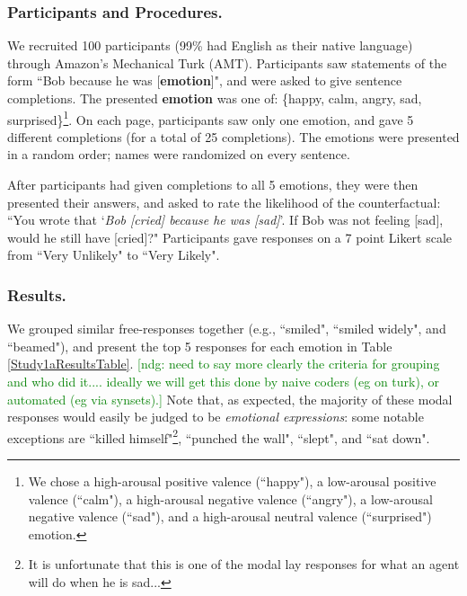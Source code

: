 \documentclass[10pt,letterpaper]{article}
\newcommand{\ndg}[1]{\textcolor{Green}{[ndg: #1]}}
\begin{document}

\subsubsection{Participants and Procedures.} 
We recruited 100 participants (99\% had English as their native language) through Amazon's Mechanical Turk (AMT). Participants saw statements of the form ``Bob \underline{\hspace{3em}} because he was [\textbf{emotion}]", and were asked to give sentence completions. The presented \textbf{emotion} was one of: \{happy, calm, angry, sad, surprised\}\footnote{We chose a high-arousal positive valence (``happy"), a low-arousal positive valence (``calm"), a high-arousal negative valence (``angry"), a low-arousal negative valence (``sad"), and a high-arousal neutral valence (``surprised") emotion.}. On each page, participants saw only one emotion, and gave 5 different completions (for a total of 25 completions). The emotions were presented in a random order; names were randomized on every sentence.

After participants had given completions to all 5 emotions, they were then presented their answers, and asked to rate the likelihood of the counterfactual: ``You wrote that `\textit{Bob [cried] because he was [sad]}'. If Bob was not feeling [sad], would he still have [cried]?" Participants gave responses on a 7 point Likert scale from ``Very Unlikely" to ``Very Likely". 




\subsubsection{Results.} 
We grouped similar free-responses together (e.g., ``smiled", ``smiled widely", and ``beamed"), and present the top 5 responses for each emotion in Table \ref{Study1aResultsTable}. 
\ndg{need to say more clearly the criteria for grouping and who did it.... ideally we will get this done by naive coders (eg on turk), or automated (eg via synsets).}
Note that, as expected, the majority of these modal responses would easily be judged to be \textit{emotional expressions}: some notable exceptions are ``killed himself"\footnote{It is unfortunate that this is one of the modal lay responses for what an agent will do when he is sad...}, ``punched the wall", ``slept", and ``sat down".
\end{document}
